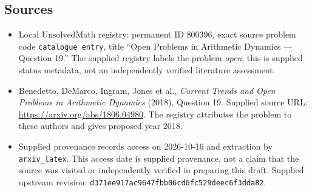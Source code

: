 \documentclass[11pt]{article}
\begin{document}
\subsection{Sources}
\begin{itemize}
\item Local UnsolvedMath registry: permanent ID $800396$, exact source problem code \texttt{catalogue entry}, title ``Open Problems in Arithmetic Dynamics --- Question 19.'' The supplied registry labels the problem \emph{open}; this is supplied status metadata, not an independently verified literature assessment.
\item Benedetto, DeMarco, Ingram, Jones et al., \emph{Current Trends and Open Problems in Arithmetic Dynamics} (2018), Question 19. Supplied source URL: \url{https://arxiv.org/abs/1806.04980}. The registry attributes the problem to these authors and gives proposed year 2018.
\item Supplied provenance records access on 2026-10-16 and extraction by \texttt{arxiv\_latex}. This access date is supplied provenance, not a claim that the source was visited or independently verified in preparing this draft. Supplied upstream revision: \texttt{d371ee917ac9647fbb06cd6fc529deec6f3dda82}.
\end{itemize}
\end{document}
